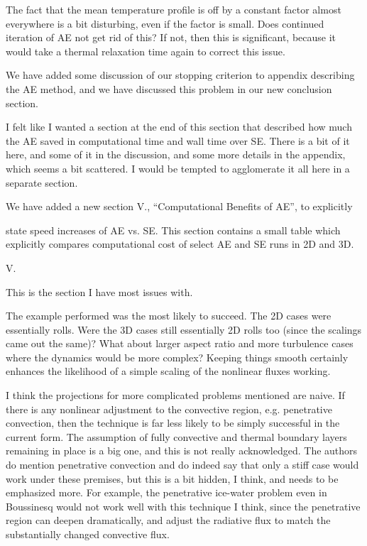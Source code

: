 \documentclass[aps, 11pt, singlecolumn]{revtex4-1} %
\begin{document}
\begin{singlespace}
\begin{myquotation}
The fact that the mean temperature profile is off by a constant factor
almost everywhere is a bit disturbing, even if the factor is small.
Does continued iteration of AE not get rid of this? If not, then this
is significant, because it would take a thermal relaxation time again
to correct this issue.
\end{myquotation}
We have added some discussion of our stopping criterion to appendix describing
the AE method, and we have discussed this problem in our new conclusion section.

\begin{myquotation}
I felt like I wanted a section at the end of this section that
described how much the AE saved in computational time and wall time
over SE. There is a bit of it here, and some of it in the discussion,
and some more details in the appendix, which seems a bit scattered. I
would be tempted to agglomerate it all here in a separate section.
\end{myquotation}
We have added a new section V., ``Computational Benefits of AE'', to explicitly

state speed increases of AE vs. SE. This section contains a small table which
explicitly compares computational cost of select AE and SE runs in 2D and 3D.

\begin{myquotation}
V.

This is the section I have most issues with.

The example performed was the most likely to succeed. The 2D cases
were essentially rolls. Were the 3D cases still essentially 2D rolls
too (since the scalings came out the same)? What about larger aspect
ratio and more turbulence cases where the dynamics would be more
complex? Keeping things smooth certainly enhances the likelihood of a
simple scaling of the nonlinear fluxes working.

I think the projections for more complicated problems mentioned are
naive. If there is any nonlinear adjustment to the convective region,
e.g. penetrative convection, then the technique is far less likely to
be simply successful in the current form. The assumption of fully
convective and thermal boundary layers remaining in place is a big
one, and this is not really acknowledged. The authors do mention
penetrative convection and do indeed say that only a stiff case would
work under these premises, but this is a bit hidden, I think, and
needs to be emphasized more. For example, the penetrative ice-water
problem even in Boussinesq would not work well with this technique I
think, since the penetrative region can deepen dramatically, and
adjust the radiative flux to match the substantially changed
convective flux.


\end{myquotation}
\end{singlespace}
\end{document}
